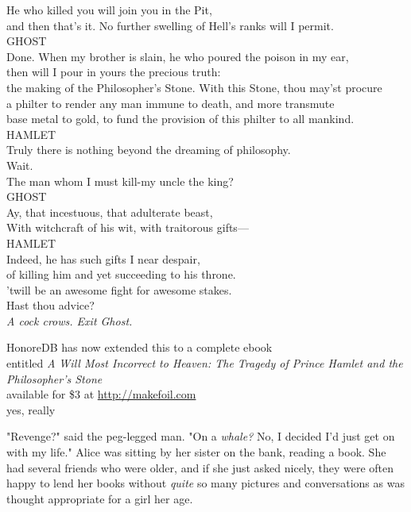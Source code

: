 \noindent{}He who killed you will join you in the Pit,\\
and then that's it. No further swelling of Hell's ranks will I permit.\\

\noindent{}GHOST\\
Done. When my brother is slain, he who poured the poison in my ear,\\
then will I pour in yours the precious truth:\\
the making of the Philosopher's Stone. With this Stone, thou may'st procure\\
a philter to render any man immune to death, and more transmute\\
base metal to gold, to fund the provision of this philter to all mankind.\\

\noindent{}HAMLET\\
Truly there is nothing beyond the dreaming of philosophy.\\
Wait.\\
The man whom I must kill-my uncle the king?\\

\noindent{}GHOST\\
Ay, that incestuous, that adulterate beast,\\
With witchcraft of his wit, with traitorous gifts---\\

\noindent{}HAMLET\\
Indeed, he has such gifts I near despair,\\
of killing him and yet succeeding to his throne.\\
'twill be an awesome fight for awesome stakes.\\
Hast thou advice?\\

\emph{A cock crows. Exit Ghost.}

\begin{center}
HonoreDB has now extended this to a complete ebook\\
entitled \emph{A Will Most Incorrect to Heaven: The Tragedy of Prince Hamlet and 
the Philosopher's Stone}\\
available for \$3 at \url{http://makefoil.com}\\
yes, really
\end{center}
\sbreak
"Revenge?" said the peg-legged man. "On a \emph{whale?} No, I decided I'd just 
get on with my life."
\sbreak
Alice was sitting by her sister on the bank, reading a book. She had several 
friends who were older, and if she just asked nicely, they were often happy to 
lend her books without \emph{quite} so many pictures and conversations as was 
thought appropriate for a girl her age.

